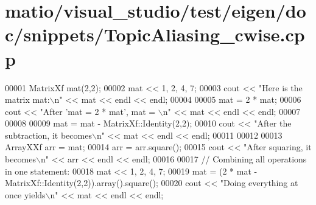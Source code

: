 \hypertarget{matio_2visual__studio_2test_2eigen_2doc_2snippets_2_topic_aliasing__cwise_8cpp_source}{}\section{matio/visual\+\_\+studio/test/eigen/doc/snippets/\+Topic\+Aliasing\+\_\+cwise.cpp}
\label{matio_2visual__studio_2test_2eigen_2doc_2snippets_2_topic_aliasing__cwise_8cpp_source}

\begin{DoxyCode}
00001 MatrixXf mat(2,2); 
00002 mat << 1, 2,  4, 7;
00003 cout << \textcolor{stringliteral}{"Here is the matrix mat:\(\backslash\)n"} << mat << endl << endl;
00004 
00005 mat = 2 * mat;
00006 cout << \textcolor{stringliteral}{"After 'mat = 2 * mat', mat = \(\backslash\)n"} << mat << endl << endl;
00007 
00008 
00009 mat = mat - MatrixXf::Identity(2,2);
00010 cout << \textcolor{stringliteral}{"After the subtraction, it becomes\(\backslash\)n"} << mat << endl << endl;
00011 
00012 
00013 ArrayXXf arr = mat;
00014 arr = arr.square();
00015 cout << \textcolor{stringliteral}{"After squaring, it becomes\(\backslash\)n"} << arr << endl << endl;
00016 
00017 \textcolor{comment}{// Combining all operations in one statement:}
00018 mat << 1, 2,  4, 7;
00019 mat = (2 * mat - MatrixXf::Identity(2,2)).array().square();
00020 cout << \textcolor{stringliteral}{"Doing everything at once yields\(\backslash\)n"} << mat << endl << endl;
\end{DoxyCode}
